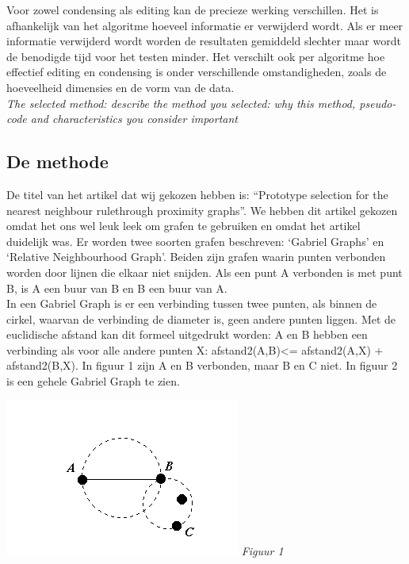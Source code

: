 \documentclass{article}
\begin{document}
Voor zowel condensing als editing kan de precieze werking verschillen. Het is afhankelijk van het algoritme hoeveel informatie er verwijderd wordt. Als er meer informatie verwijderd wordt worden de resultaten gemiddeld slechter maar wordt de benodigde tijd voor het testen minder. Het verschilt ook per algoritme hoe effectief editing en condensing is onder verschillende omstandigheden, zoals de hoeveelheid dimensies en de vorm van de data.\\

\emph{The selected method: describe the method you selected: why this method, pseudo-code and characteristics you consider important}\\

\subsection{De methode}
De titel van het artikel dat wij gekozen hebben is: “Prototype selection for the nearest neighbour rulethrough proximity graphs”. We hebben dit artikel gekozen omdat het ons wel leuk leek om grafen te gebruiken en omdat het artikel duidelijk was. Er worden twee soorten grafen beschreven: ‘Gabriel Graphs’ en ‘Relative Neighbourhood Graph’. Beiden zijn grafen waarin punten verbonden worden door lijnen die elkaar niet snijden. Als een punt A verbonden is met punt B, is A een buur van B en B een buur van A.\\

In een Gabriel Graph is er een verbinding tussen twee punten, als binnen de cirkel, waarvan de verbinding de diameter is, geen andere punten liggen. Met de euclidische afstand kan dit formeel uitgedrukt worden: A en B hebben een verbinding als voor alle andere punten X: afstand2(A,B)<= afstand2(A,X) + afstand2(B,X). In figuur 1 zijn A en B verbonden, maar B en C niet. In figuur 2 is een gehele Gabriel Graph te zien. \\

\begin{center} \includegraphics[keepaspectratio=true]{GGburen} \emph{Figuur 1} \end{center}
\end{document}

